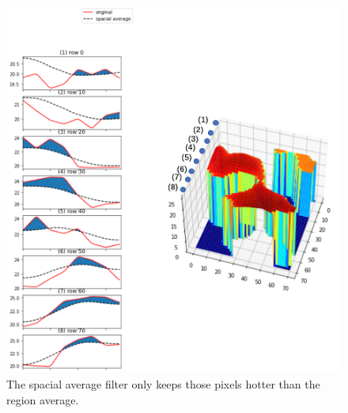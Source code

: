 \begin{figure}
  \centering
  \includegraphics[width=\textwidth]{figures/spacefilter.png}
  \caption{The spacial average filter only keeps those pixels hotter than the region average.}\label{fig:detection3d}
\end{figure}

